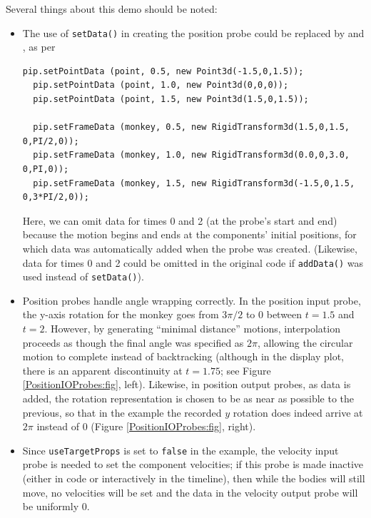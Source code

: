 Several things about this demo should be noted:

\begin{itemize}

\item The use of {\tt setData()} in creating the position probe could 
be replaced by
 and
, as per
%
\begin{lstlisting}[]
  pip.setPointData (point, 0.5, new Point3d(-1.5,0,1.5)); 
  pip.setPointData (point, 1.0, new Point3d(0,0,0)); 
  pip.setPointData (point, 1.5, new Point3d(1.5,0,1.5));

  pip.setFrameData (monkey, 0.5, new RigidTransform3d(1.5,0,1.5, 0,PI/2,0));
  pip.setFrameData (monkey, 1.0, new RigidTransform3d(0.0,0,3.0, 0,PI,0));
  pip.setFrameData (monkey, 1.5, new RigidTransform3d(-1.5,0,1.5, 0,3*PI/2,0));
\end{lstlisting}
%
Here, we can omit data for times 0 and 2 (at the probe's start and end) because
the motion begins and ends at the components' initial positions, for which data
was automatically added when the probe was created. (Likewise, data for times 0
and 2 could be omitted in the original code if {\tt addData()} was used instead
of {\tt setData()}).

\item Position probes handle angle wrapping correctly.
In the position input probe, the y-axis rotation for the monkey goes
from $3 \pi/2$ to $0$ between $t = 1.5$ and $t = 2$.  However, by generating
``minimal distance'' motions, interpolation proceeds as though the final angle
was specified as $2 \pi$, allowing the circular motion to complete instead of
backtracking (although in the display plot, there is an apparent discontinuity
at $t = 1.75$; see Figure \ref{PositionIOProbes:fig}, left).  Likewise, in
position output probes, as data is added, the rotation representation is
chosen to be as near as possible to the previous, so that in the
example the recorded $y$ rotation does indeed arrive at $2 \pi$ instead of $0$
(Figure \ref{PositionIOProbes:fig}, right).

\item Since {\tt useTargetProps} is set to {\tt false} in the example,
the velocity input probe is needed to set the component velocities; if this
probe is made inactive (either in code or interactively in the timeline), then
while the bodies will still move, no velocities will be set and the data in the
velocity output probe will be uniformly 0.


\end{itemize}
